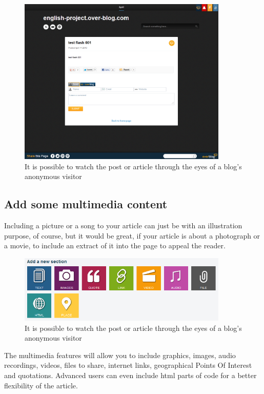 \documentclass[a4paper,10pt]{article}
\begin{document}
\begin{figure}[H]
    \center
	\includegraphics[width=10cm]{Images/view001.png}
    \caption{It is possible to watch the post or article through the eyes of a blog's anonymous visitor}
\end{figure}

\newpage

\subsection{Add some multimedia content}

Including a picture or a song to your article can just be with an illustration purpose, of course, but it would be great, if your article is about a photograph or a movie, to include an extract of it into the page to appeal the reader. 

\begin{figure}[H]
    \center
	\includegraphics[width=10cm]{Images/multimedia001.png}
    \caption{It is possible to watch the post or article through the eyes of a blog's anonymous visitor}
\end{figure}

The multimedia features will allow you to include graphics, images, audio recordings, videos, files to share, internet links, geographical Points Of Interest and quotations. Advanced users can even include html parts of code for a better flexibility of the article. 
\end{document}
